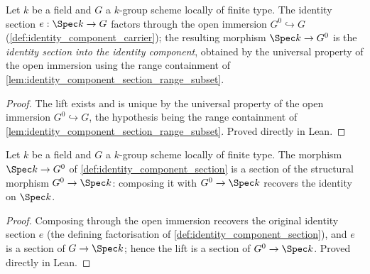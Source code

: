 \begin{definition}

  \label{def:identity_component_section}
  Let \(k\) be a field and \(G\) a \(k\)-group scheme locally of finite
  type. The identity section \(e : \Spec k \to G\) factors through the
  open immersion \(G^0 \hookrightarrow G\)
  (\cref{def:identity_component_carrier}); the resulting morphism
  \(\Spec k \to G^0\) is the \emph{identity section into the identity
  component}, obtained by the universal property of the open immersion
  using the range containment of
  \cref{lem:identity_component_section_range_subset}.
\end{definition}
\begin{proof}
  The lift exists and is unique by the universal property of the open
  immersion \(G^0 \hookrightarrow G\), the hypothesis being the range
  containment of \cref{lem:identity_component_section_range_subset}.
  Proved directly in Lean.
\end{proof}

\begin{lemma}

  \label{lem:identity_component_section_is_section}
  Let \(k\) be a field and \(G\) a \(k\)-group scheme locally of finite
  type. The morphism \(\Spec k \to G^0\) of
  \cref{def:identity_component_section} is a section of the structural
  morphism \(G^0 \to \Spec k\): composing it with \(G^0 \to \Spec k\)
  recovers the identity on \(\Spec k\).
\end{lemma}
\begin{proof}
  Composing through the open immersion recovers the original identity
  section \(e\) (the defining factorisation of
  \cref{def:identity_component_section}), and \(e\) is a section of
  \(G \to \Spec k\); hence the lift is a section of \(G^0 \to \Spec k\).
  Proved directly in Lean.
\end{proof}


